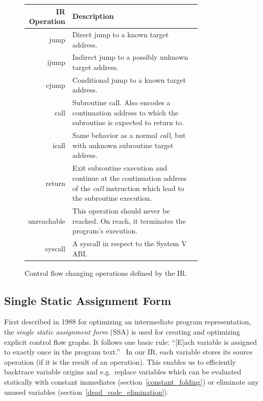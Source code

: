 \documentclass[course=eragp]{aspdoc}
\begin{document}
\begin{figure}
    \begin{center}
        \def\arraystretch{1.5}
        \begin{tabular}{r | p{0.8\linewidth}}
            \hline
            IR Operation & Description                                                                   \\ [0.5ex]
            \hline
            jump         & Direct jump to a known target address.                                        \\
            ijump        & Indirect jump to a possibly unknown target address.                           \\
            cjump        & Conditional jump to a known target address.                                   \\
            call         & Subroutine call. Also encodes a continuation address to which the subroutine
            is expected to return to.                                                                    \\
            icall        & Same behavior as a normal \textit{call}, but with unknown subroutine target
            address.                                                                                     \\
            return       & Exit subroutine execution and continue at the continuation address of the
            \textit{call} instruction which lead to the subroutine execution.                            \\
            unreachable  & This operation should never be reached. On reach, it terminates the program's
            execution.                                                                                   \\
            syscall      & A syscall in respect to the System V ABI.                                     \\
            \hline
        \end{tabular}
        \caption{Control flow changing operations defined by the IR.}\label{figure:cfops}
    \end{center}
\end{figure}

\subsection{Single Static Assignment Form}\label{ssa}

First described in 1988 for optimizing an intermediate program representation\cite{ssa_proposal},
the \emph{single static assignment form} (SSA) is used for creating and optimizing explicit control
flow graphs. It follows one basic rule: ``[E]ach variable is
assigned to exactly once in the program text.''~\cite{ssa_proposal} In our IR, each variable
stores its source operation (if it is the result of an operation). This enables us to efficiently
backtrace variable origins and e.g.\ replace variables which can be evaluated statically with constant
immediates (section~\ref{constant_folding}) or eliminate any unused variables (section~\ref{dead_code_elimination}).
\end{document}
